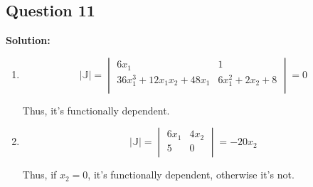 \documentclass[11pt]{article} %
\begin{document}
\begin{enumerate}
\section{Question 11}

\textbf{Solution:}

\begin{enumerate}
	\item 
	
	$$
	|\mathbb{J}|=
	\begin{vmatrix}
		6x_1 & 1 \\
		36x_1^3+12x_1x_2+48x_1 &	6x_1^2+2x_2+8 \\
	\end{vmatrix}=0
$$

Thus, it's functionally dependent.

\item 
$$
|\mathbb{J}|=
\begin{vmatrix}
	6x_1&4x_2\\
	5&0\\
\end{vmatrix}=-20x_2
$$

Thus, if $x_2=0$, it's functionally dependent, otherwise it's not.


\end{enumerate}





\end{enumerate}
\end{document}
